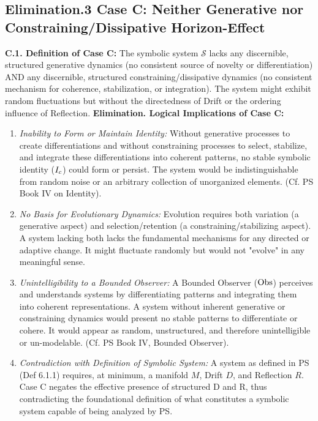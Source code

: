 \subsection{Elimination.3 Case C: Neither Generative nor Constraining/Dissipative Horizon-Effect} \label{subsec:appC_case_c_neither_generative_nor_constraining_dissipative}
\textbf{C.1. Definition of Case C:} The symbolic system \(\mathcal{S}\) lacks any discernible, structured generative dynamics (no consistent source of novelty or differentiation) AND any discernible, structured constraining/dissipative dynamics (no consistent mechanism for coherence, stabilization, or integration). The system might exhibit random fluctuations but without the directedness of Drift or the ordering influence of Reflection.
\textbf{Elimination. Logical Implications of Case C:}
\begin{enumerate}
    \item \emph{Inability to Form or Maintain Identity:} Without generative processes to create differentiations and without constraining processes to select, stabilize, and integrate these differentiations into coherent patterns, no stable symbolic identity (\(I_c\)) could form or persist. The system would be indistinguishable from random noise or an arbitrary collection of unorganized elements. (Cf. PS Book IV on Identity).
    \item \emph{No Basis for Evolutionary Dynamics:} Evolution requires both variation (a generative aspect) and selection/retention (a constraining/stabilizing aspect). A system lacking both lacks the fundamental mechanisms for any directed or adaptive change. It might fluctuate randomly but would not "evolve" in any meaningful sense.
    \item \emph{Unintelligibility to a Bounded Observer:} A Bounded Observer (\(\mathrm{Obs}\)) perceives and understands systems by differentiating patterns and integrating them into coherent representations. A system without inherent generative or constraining dynamics would present no stable patterns to differentiate or cohere. It would appear as random, unstructured, and therefore unintelligible or un-modelable. (Cf. PS Book IV, Bounded Observer).
    \item \emph{Contradiction with Definition of Symbolic System:} A system as defined in PS (Def 6.1.1) requires, at minimum, a manifold \(M\), Drift \(D\), and Reflection \(R\). Case C negates the effective presence of structured D and R, thus contradicting the foundational definition of what constitutes a symbolic system capable of being analyzed by PS.
\end{enumerate}
